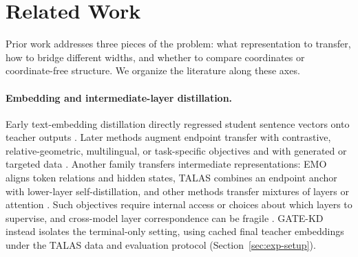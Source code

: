 \section{Related Work}
\label{sec:related-work}

Prior work addresses three pieces of the problem: what representation to
transfer, how to bridge different widths, and whether to compare coordinates
or coordinate-free structure. We organize the literature along these axes.

\paragraph{Embedding and intermediate-layer distillation.}
Early text-embedding distillation directly regressed student sentence vectors
onto teacher outputs \citep{reimers2020multilingual}. Later methods augment
endpoint transfer with contrastive, relative-geometric, multilingual, or
task-specific objectives
\citep{gao2021distilcse,xu2023distillcse,simtde2023,lealla2023,kim2023embeddistill,zhang2024jasper,li2025ese,leaf}
and with generated or targeted data \citep{lee2024gecko,akram2026jina}. Another
family transfers intermediate representations: EMO aligns token relations and
hidden states, TALAS combines an endpoint anchor with lower-layer
self-distillation, and other methods transfer mixtures of layers or attention
\citep{truong2025emo,talas,vu2026mol,wang2024feature}. Such objectives require
internal access or choices about which layers to supervise, and cross-model
layer correspondence can be fragile
\citep{ko2023revisiting,kim2025layerselection}. GATE-KD instead isolates the
terminal-only setting, using cached final teacher embeddings under the TALAS
data and evaluation protocol (Section~\ref{sec:exp-setup}).

